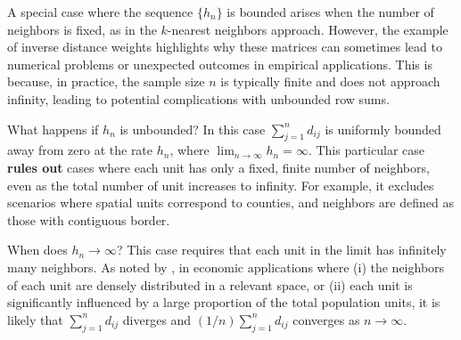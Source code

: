\documentclass[english,12pt]{book}\usepackage[]{graphicx}\usepackage[]{xcolor}
\begin{document}
A special case where the sequence $\{h_n\}$ is bounded arises when the number of neighbors is fixed, as in the $k$-nearest neighbors approach. However, the example of inverse distance weights highlights why these matrices can sometimes lead to numerical problems or unexpected outcomes in empirical applications. This is because, in practice, the sample size $n$ is typically finite and does not approach infinity, leading to potential complications with unbounded row sums.




What happens if $h_n$ is unbounded? In this case $\sum_{j = 1}^nd_{ij}$ is uniformly bounded away from zero at the rate $h_n$, where $\lim_{n\to \infty}h_n = \infty$. This particular case \textbf{rules out} cases where each unit has only a fixed, finite number of neighbors, even as the total number of unit increases to infinity. For example, it excludes scenarios where spatial units correspond to counties, and neighbors are defined as those with contiguous border.

When does $h_n \to \infty$? This case requires that each unit in the limit has infinitely many neighbors. As noted by \cite{lee2002consistency}, in economic applications where (i) the neighbors of each unit are densely distributed in a relevant space, or (ii) each unit is significantly influenced by a large proportion of the total population units, it is likely that $\sum_{j=1}^n d_{ij}$ diverges and $(1/n)\sum_{j=1}^n d_{ij}$ converges as $n \to \infty$.   
\end{document}

